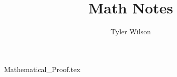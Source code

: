 \documentclass[11pt, fleqn]{article}
\title{Math Notes}
\author{Tyler Wilson}
\date{}
\begin{document}
\allowdisplaybreaks

\maketitle
\tableofcontents

{Mathematical_Proof.tex}
\end{document}
